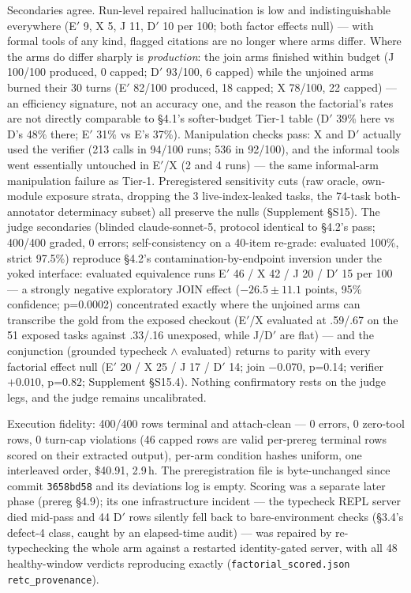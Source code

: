 \documentclass[10pt]{article}
\newcommand{\code}[1]{\texttt{#1}}
\newcommand{\Ssec}[1]{Supplement \S #1}
\begin{document}
Secondaries agree. Run-level repaired hallucination is low and
indistinguishable everywhere (E$'$ 9, X 5, J 11, D$'$ 10 per 100; both
factor effects null) --- with formal tools of any kind, flagged
citations are no longer where arms differ. Where the arms do differ
sharply is \emph{production}: the join arms finished within budget (J
100/100 produced, 0 capped; D$'$ 93/100, 6 capped) while the unjoined
arms burned their 30 turns (E$'$ 82/100 produced, 18 capped; X 78/100,
22 capped) --- an efficiency signature, not an accuracy one, and the
reason the factorial's rates are not directly comparable to \S 4.1's
softer-budget Tier-1 table (D$'$ 39\% here vs D's 48\% there; E$'$
31\% vs E's 37\%). Manipulation checks pass: X and D$'$ actually used
the verifier (213 calls in 94/100 runs; 536 in 92/100), and the
informal tools went essentially untouched in E$'$/X (2 and 4 runs) ---
the same informal-arm manipulation failure as Tier-1. Preregistered
sensitivity cuts (raw oracle, own-module exposure strata, dropping the
3 live-index-leaked tasks, the 74-task both-annotator determinacy
subset) all preserve the nulls (\Ssec{S15}). The judge secondaries (blinded claude-sonnet-5,
protocol identical to \S 4.2's pass; 400/400 graded, 0 errors;
self-consistency on a 40-item re-grade: evaluated 100\%, strict
97.5\%) reproduce \S 4.2's contamination-by-endpoint inversion under
the yoked interface: evaluated equivalence runs E$'$ 46 / X 42 / J 20
/ D$'$ 15 per 100 --- a strongly negative exploratory JOIN effect
($-26.5 \pm 11.1$ points, 95\% confidence; p=0.0002) concentrated
exactly where
the unjoined arms can transcribe the gold from the exposed checkout
(E$'$/X evaluated at .59/.67 on the 51 exposed tasks against .33/.16
unexposed, while J/D$'$ are flat) --- and the conjunction (grounded
typecheck $\wedge$ evaluated) returns to parity with every factorial
effect null (E$'$ 20 / X 25 / J 17 / D$'$ 14; join $-0.070$, p=0.14;
verifier $+0.010$, p=0.82; \Ssec{S15.4}). Nothing confirmatory rests
on the judge legs, and the judge remains uncalibrated.

Execution fidelity: 400/400 rows terminal and attach-clean --- 0
errors, 0 zero-tool rows, 0 turn-cap violations (46 capped rows are
valid per-prereg terminal rows scored on their extracted output),
per-arm condition hashes uniform, one interleaved order, \$40.91,
2.9\,h. The preregistration file is byte-unchanged since commit
\code{3658bd58} and its deviations log is empty. Scoring was a
separate later phase (prereg \S 4.9); its one infrastructure incident
--- the typecheck REPL server died mid-pass and 44 D$'$ rows silently
fell back to bare-environment checks (\S 3.4's defect-4 class, caught
by an elapsed-time audit) --- was repaired by re-typechecking the
whole arm against a restarted identity-gated server, with all 48
healthy-window verdicts reproducing exactly
(\code{factorial\_scored.json} \code{retc\_provenance}).
\end{document}
